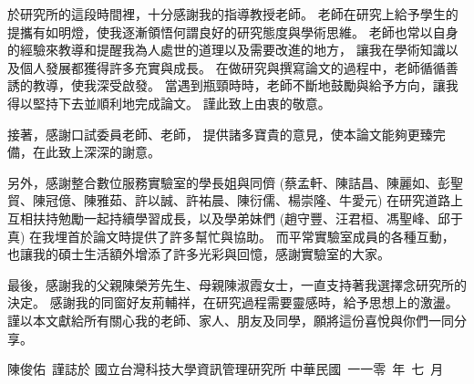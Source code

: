 
\begin{acknowledgement}

    於研究所的這段時間裡，十分感謝我的指導教授\underline{\advisor}老師。
老師在研究上給予學生的提攜有如明燈，使我逐漸領悟何謂良好的研究態度與學術思維。
老師也常以自身的經驗來教導和提醒我為人處世的道理以及需要改進的地方，
讓我在學術知識以及個人發展都獲得許多充實與成長。
在做研究與撰寫論文的過程中，老師循循善誘的教導，使我深受啟發。
當遇到瓶頸時時，老師不斷地鼓勵與給予方向，讓我得以堅持下去並順利地完成論文。
謹此致上由衷的敬意。

    接著，感謝口試委員\underline{\qquad}老師、\underline{\qquad}老師，
提供諸多寶貴的意見，使本論文能夠更臻完備，在此致上深深的謝意。

    另外，感謝整合數位服務實驗室的學長姐與同儕
(蔡孟軒、陳詰昌、陳麗如、彭聖貿、陳冠億、陳雅茹、許以誠、許祐晨、陳衍儒、楊崇隆、牛愛元)
在研究道路上互相扶持勉勵一起持續學習成長，以及學弟妹們
(趙守豐、汪君桓、馮聖峰、邱于真)
在我埋首於論文時提供了許多幫忙與協助。
而平常實驗室成員的各種互動，也讓我的碩士生活額外增添了許多光彩與回憶，感謝實驗室的大家。

    最後，感謝我的父親陳榮芳先生、母親陳淑霞女士，一直支持著我選擇念研究所的決定。
感謝我的同窗好友荊輔祥，在研究過程需要靈感時，給予思想上的激盪。
謹以本文獻給所有關心我的老師、家人、朋友及同學，願將這份喜悅與你們一同分享。

\mbox{}
\vfill
\mbox{}\hfill 陳俊佑~謹誌於
\newline
\mbox{}\hfill 國立台灣科技大學資訊管理研究所
\newline
\mbox{}\hfill 中華民國~一一零~年~七~月
\bigbreak

\end{acknowledgement}